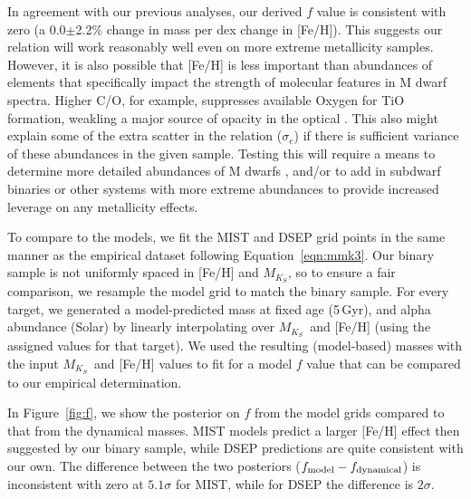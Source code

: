 \documentclass[twocolumn]{aastex62}
\newcommand{\mks}{$M_{K_S}$}
\begin{document}
In agreement with our previous analyses, our derived $f$ value is consistent with zero (a 0.0$\pm$2.2\% change in mass per dex change in [Fe/H]). This suggests our relation will work reasonably well even on more extreme metallicity samples. However, it is also possible that [Fe/H] is less important than abundances of elements that specifically impact the strength of molecular features in M dwarf spectra. Higher C/O, for example, suppresses available Oxygen for TiO formation, weakling a major source of opacity in the optical \citep[e.g., C, O, Ti,][]{2012ApJ...747L..27F,2015ApJ...804...40G,Veyette2016a}. This also might explain some of the extra scatter in the relation ($\sigma_e$) if there is sufficient variance of these abundances in the given sample. Testing this will require a means to determine more detailed abundances of M dwarfs \citep[e.g.,][]{Veyette2017}, and/or to add in subdwarf binaries or other systems with more extreme abundances to provide increased leverage on any metallicity effects. 

To compare to the models, we fit the MIST and DSEP grid points in the same manner as the empirical dataset following Equation~\ref{eqn:mmk3}. Our binary sample is not uniformly spaced in [Fe/H] and \mks, so to ensure a fair comparison, we resample the model grid to match the binary sample. For every target, we generated a model-predicted mass at fixed age (5\,Gyr), and alpha abundance (Solar) by linearly interpolating over \mks\ and [Fe/H] (using the assigned values for that target). We used the resulting (model-based) masses with the input \mks\ and [Fe/H] values to fit for a model $f$ value that can be compared to our empirical determination.

In Figure~\ref{fig:f}, we show the posterior on $f$ from the model grids compared to that from the dynamical masses. MIST models predict a larger [Fe/H] effect then suggested by our binary sample, while DSEP predictions are quite consistent with our own. The difference between the two posteriors ($f_{\rm{model}}-f_{\rm{dynamical}}$) is inconsistent with zero at $5.1\sigma$ for MIST, while for DSEP the difference is $2\sigma$. 
\end{document}
